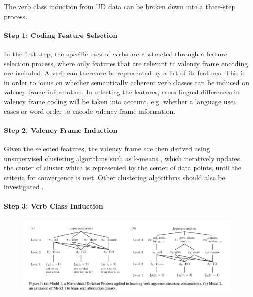 The verb class induction from UD data can be broken down into a three-step process. 

\paragraph{\textbf{Step 1: Coding Feature Selection}}
In the first step, the specific uses of verbs are abstracted through a feature selection process, where only features that are relevant to valency frame encoding are included. A verb can therefore be represented by a list of its features. This is in order to focus on whether semantically coherent verb classes can be induced on valency frame information. In selecting the features, cross-lingual differences in valency frame coding will be taken into account, e.g. whether a language uses cases or word order to encode valency frame information. 

\paragraph{\textbf{Step 2: Valency Frame Induction}}
Given the selected features, the valency frame are then derived using unsupervised clustering algorithms such as k-means \citep{macqueen1967}, which iteratively updates the center of cluster which is represented by the center of data points, until the criteria for convergence is met. Other clustering algorithms should also be investigated \citep{xu2015a}. 

\paragraph{\textbf{Step 3: Verb Class Induction}}

\begin{figure}
    \includegraphics[width=\textwidth]{figures/verb_alternation_classes.png}
    \centering    
\end{figure}

